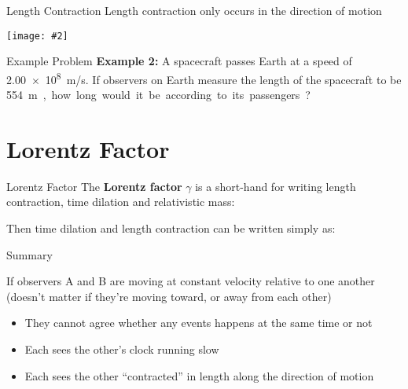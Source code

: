 \documentclass[12pt,compress,aspectratio=169]{beamer}
\newcommand{\pic}[2]{\texttt{[image: \#2]}}
\newcommand{\bigsqrt}{\ensuremath\sqrt{1-\left(\frac{v}c\right)^2}}
\newcommand{\lorentz}{\ensuremath\frac1\bigsqrt}
\newcommand{\eq}[2]{\vspace{#1}{\Large\begin{displaymath}#2\end{displaymath}}}
\begin{document}
\begin{frame}{Length Contraction}
  Length contraction only occurs in the direction of motion
  \begin{center}
    \pic{.8}{graphics/baseball-contraction}
    \end{center}
\end{frame}



\begin{frame}{Example Problem}
  \textbf{Example 2:} A spacecraft passes Earth at a speed of \SI{2.00e8}{m/s}.
  If observers on Earth measure the length of the spacecraft to be
  \SI{554}\metre, how long would it be according to its passengers?
\end{frame}


\section{Lorentz Factor}

\begin{frame}{Lorentz Factor}
  The \textbf{Lorentz factor} $\gamma$ is a short-hand for writing length
  contraction, time dilation and relativistic mass:

  \eq{-.2in}{
    \boxed{\gamma=\lorentz}
  }
  
  Then time dilation and length contraction can be written simply as:
  
  \eq{-.1in}{
    \boxed{t'=\gamma t}\quad\boxed{L'=\frac{L}\gamma}
  }
\end{frame}



\begin{frame}{Summary}
  \begin{center}
  \end{center}
  If observers A and B are moving at constant velocity relative to one another
  (doesn't matter if they're moving toward, or away from each other)
  \begin{itemize}
  \item They cannot agree whether any events happens at the same time or not
  \item Each sees the other's clock running slow
  \item Each sees the other ``contracted'' in length along the direction of
    motion
  \end{itemize}
\end{frame}
\end{document}
